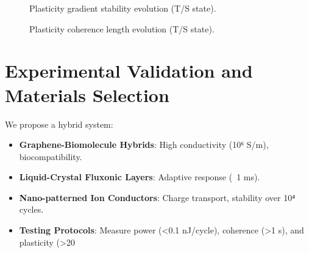 \documentclass[11pt]{article}
\begin{document}
\begin{figure}[ht]
    \centering
    \caption{Plasticity gradient stability evolution (T/S state).}
    \label{fig:plas_grad}
\end{figure}

\begin{figure}[ht]
    \centering
    \caption{Plasticity coherence length evolution (T/S state).}
    \label{fig:plas_coh}
\end{figure}

\section{Experimental Validation and Materials Selection}
We propose a hybrid system:
\begin{itemize}
    \item \textbf{Graphene-Biomolecule Hybrids}: High conductivity (10⁶ S/m), biocompatibility.
    \item \textbf{Liquid-Crystal Fluxonic Layers}: Adaptive response (~1 ms).
    \item \textbf{Nano-patterned Ion Conductors}: Charge transport, stability over 10⁴ cycles.
    \item \textbf{Testing Protocols}: Measure power (<0.1 nJ/cycle), coherence (>1 s), and plasticity (>20%
\end{itemize}
\end{document}
